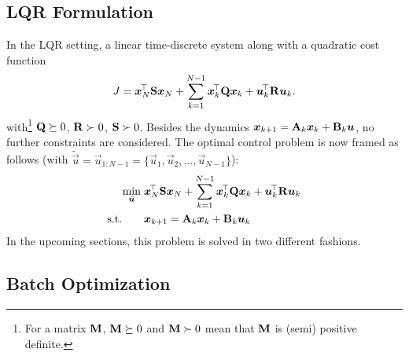 		\subsection{LQR Formulation}
			In the LQR setting, a linear time-discrete system along with a quadratic cost function
			\begin{equation}
				J = \bm{x}_N^{\!\top} \bm{\mathrm{S}} \bm{x}_N + \sum_{k = 1}^{N - 1} \bm{x}_k^{\!\top} \bm{\mathrm{Q}} \bm{x}_k + \bm{u}_k^{\!\top} \bm{\mathrm{R}} \bm{u}_k.  \label{eqn:lqrCost}
			\end{equation}
			with\footnote{For a matrix \(\bm{\mathrm{M}}\), \( \bm{\mathrm{M}} \succeq 0\) and \( \bm{\mathrm{M}} \succ 0 \) mean that \(\bm{\mathrm{M}}\) is (semi) positive definite.} \( \bm{\mathrm{Q}} \succeq 0 \), \( \bm{\mathrm{R}} \succ 0 \), \( \bm{\mathrm{S}} \succ 0 \). Besides the dynamics \( \bm{x}_{k + 1} = \bm{\mathrm{A}}_k \bm{x}_k + \bm{\mathrm{B}}_k \bm{u} \), no further constraints are considered. The optimal control problem is now framed as follows (with \( \tilde{\vec{u}} = \vec{u}_{1:N - 1} = \{ \vec{u}_1, \vec{u}_2, \dots, \vec{u}_{N - 1} \} \)):
			\begin{align}
				\min_{\tilde{\bm{u}}}\; & \bm{x}_N^{\!\top} \bm{\mathrm{S}} \bm{x}_N + \sum_{k = 1}^{N - 1} \bm{x}_k^{\!\top} \bm{\mathrm{Q}} \bm{x}_k + \bm{u}_k^{\!\top} \bm{\mathrm{R}} \bm{u}_k \\
				\text{s.t.}\qquad        &
				\begin{aligned}
					\bm{x}_{k + 1} & = \bm{\mathrm{A}}_k \bm{x}_k + \bm{\mathrm{B}}_k \bm{u}_k
				\end{aligned}
				\label{eqn:lqr}
			\end{align}
			In the upcoming sections, this problem is solved in two different fashions.

		\subsection{Batch Optimization}
			\label{subsec:batchOpt}

